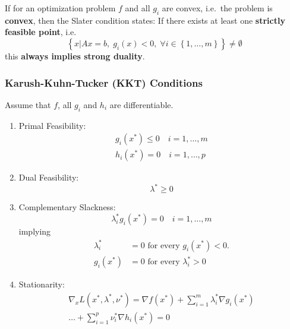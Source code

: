 \newpar{}

If for an optimization problem $f$ and all $g_i$ are convex, i.e.\ the problem is \textbf{convex}, then the Slater condition states:
\newpar{}
If there exists at least one \textbf{strictly feasible point}, i.e.
\begin{equation*}
    \left\{x | Ax = b,\; g_i(x) < 0,\; \forall i \in \left\{1, \ldots, m\right\}\right\} \neq \emptyset
\end{equation*}
this \textbf{always implies strong duality}.

\subsubsection{Karush-Kuhn-Tucker (KKT) Conditions}

Assume that $f$, all $g_i$ and $h_i$ are differentiable.
\begin{enumerate}
    \item Primal Feasibility:
          \begin{gather*}
              g_i(x^*) \leq 0 \quad i = 1, \ldots, m \\
              h_i(x^*) = 0 \quad i = 1, \ldots, p
          \end{gather*}
    \item Dual Feasibility:
          \begin{equation*}
              \lambda^* \geq 0
          \end{equation*}
    \item Complementary Slackness:
          \begin{equation*}
              \lambda_i^*g_i(x^*)=0 \quad i = 1, \ldots, m
          \end{equation*}
          implying
          \begin{align*}
              \lambda_{i}^{*} & =0\text{ for every }g_{i}(x^{*})<0.   \\
              g_{i}(x^{*})    & =0\text{ for every }\lambda_{i}^{*}>0
          \end{align*}
    \item Stationarity:
          \begin{align*}
              \nabla_x L(x^*, \lambda^*, \nu^*) =\nabla f(x^*) +\sum_{i=1}^{m}\lambda_i^*\nabla g_i(x^*) \\
              \ldots+\sum_{i=1}^{p}\nu_i^*\nabla h_i(x^*) = 0
          \end{align*}
\end{enumerate}

